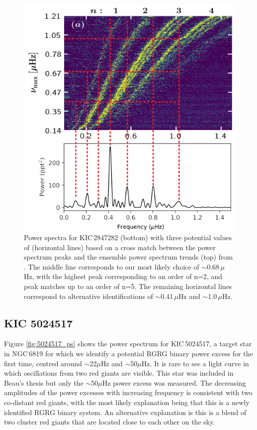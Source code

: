 \begin{figure}
    \centering
    \includegraphics[width=0.6\linewidth]{Chapter5/mode_id_MG.png}
    \caption[Power spectra with possible mode identifications for KIC\,2847282]{Power spectra for KIC\,2847282 (bottom) with three potential values of \numax{} (horizontal lines) based on a cross match between the power spectrum peaks and the ensemble power spectrum trends (top) from \cite{yu_asteroseismology_2020}. The middle line corresponds to our most likely choice of \numax{}$\sim$0.68\,$\mu$Hz, with the highest peak corresponding to an order of n=2, and peak matches up to an order of n=5. The remaining horizontal lines correspond to alternative identifications of \numax{}$\sim$0.41\,$\mu$Hz and \numax{}$\sim$1.0\,$\mu$Hz.}
    \label{fig:2847282_ps}
\end{figure}

\subsection{KIC 5024517}

Figure \ref{fig:5024517_ps} shows the power spectrum for KIC\,5024517, a \Kepler{} target star in NGC\,6819 for which we identify a potential RG\textendash{}RG binary power excess for the first time, centred around $\sim$22$\mu$Hz and $\sim$50$\mu$Hz. It is rare to see a light curve in which oscillations from two red giants are visible. This star was included in Beau's thesis \citep{bellamy_using_2015} but only the $\sim$50$\mu$Hz power excess was measured. The decreasing amplitudes of the power excesses with increasing frequency is consistent with two co-distant red giants, with the most likely explanation being that this is a newly identified RG\textendash{}RG binary system. An alternative explanation is this is a blend of two cluster red giants that are located close to each other on the sky. 

